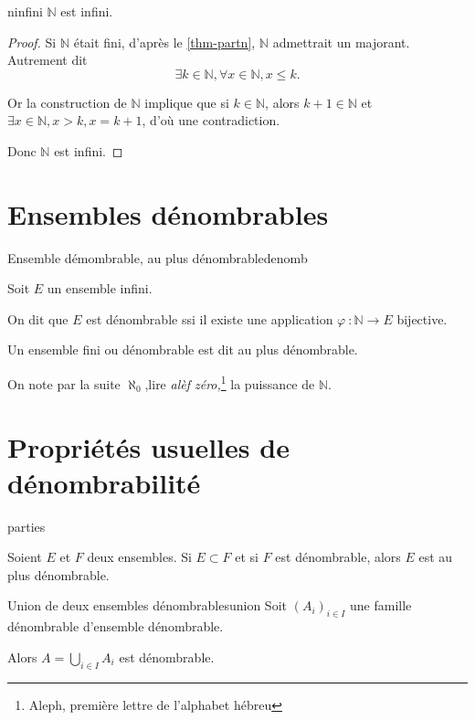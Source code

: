 \documentclass[a4paper,french,final]{memoir}
\begin{document}
\begin{theoremb}{}{ninfini}
	$\mathbb{N}$ est infini. 
\end{theoremb}


\begin{proof}
	Si $\mathbb{N}$ était fini, d'après le \cref{thm-partn}, $\mathbb{N}$ admettrait un majorant. Autrement dit \[\exists k \in \mathbb{N}, \forall x \in \mathbb{N}, x \leq k.\]

	Or la construction de $\mathbb{N}$ implique que si $ k \in \mathbb{N}$, alors $k + 1 \in \mathbb{N}$ et $\exists x \in \mathbb{N}, x > k, x= k+1$, d'où une contradiction. 
	
	Donc $\mathbb{N}$ est infini.
\end{proof}

\section{Ensembles dénombrables}

\begin{defb}{Ensemble démombrable, au plus dénombrable}{denomb}

	 Soit $E$ un ensemble infini. 
	 
	 On dit que $E$ est dénombrable ssi il existe une application $\varphi~: \mathbb{N} \to E $ bijective. 
	 
	 Un ensemble fini ou dénombrable est dit au plus dénombrable. 
\end{defb}

On note par la suite $\aleph_0$,lire \emph{alèf zéro,}\footnote{Aleph, première lettre  de l'alphabet hébreu} la puissance de $\mathbb{N}$. 

\section{Propriétés usuelles de dénombrabilité}

\begin{theoremb}{}{parties}

	Soient $E$ et $F$ deux ensembles. 
	Si $E \subset F$ et si $F$ est dénombrable, alors $E$ est au plus dénombrable.
\end{theoremb}

\begin{theoremb}{Union de deux ensembles dénombrables}{union}
    Soit $(A_i)_{i \in I}$ une famille dénombrable d'ensemble dénombrable. 
	
	Alors $A= \bigcup_{i \in I} A_i$ est dénombrable. 
\end{theoremb}
\end{document}
